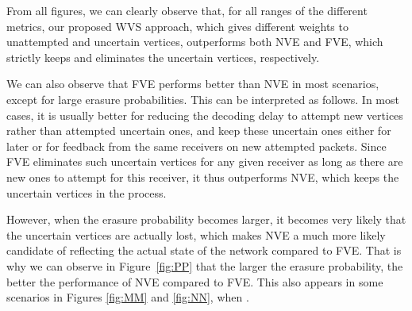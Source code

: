 \documentclass[10pt,jounral]{IEEEtran}
\newcommand{\fref}[1]{Figure~\ref{#1}}
\newcommand{\ignore}[1]{}
\begin{document}
From all figures, we can clearly observe that, for all ranges of the different metrics, our proposed WVS approach, which gives different weights to unattempted and uncertain vertices, outperforms both NVE and FVE, which strictly keeps and eliminates the uncertain vertices, respectively.

We can also observe that FVE performs better than NVE in most scenarios, except for large erasure probabilities. This can be interpreted as follows. In most cases, it is usually better for reducing the decoding delay to attempt new vertices rather than attempted uncertain ones, and keep these uncertain ones either for later or for feedback from the same receivers on new attempted packets. Since FVE eliminates such uncertain vertices for any given receiver as long as there are new ones to attempt for this receiver, it thus outperforms NVE, which keeps the uncertain vertices in the process.

However, when the erasure probability becomes larger, it becomes very likely that the uncertain vertices are actually lost, which makes NVE a much more likely candidate of reflecting the actual state of the network compared to FVE.\ignore{ follows a similar ML trend as the one proposed for the completion delay problem\footnote{The ML here is in the forward link sense only (without considering what happened to the feedback), because the decoding delay is affected by individual packet losses from each individual receiver and not the global state of the network. Consequently, ML do not follow the bounds derived in Corollaries \ref{th:ML-simple} and \ref{th:ML-simple-reciprocal} but rather the simple ML rule that the packet is received (lost) on the forward link if the erasure probability is smaller (larger) than 0.5}, whereas FVE falls away from this ML trend.} That is why we can observe in \fref{fig:PP} that the larger the erasure probability, the better the performance of NVE compared to FVE. This also appears in some scenarios in Figures \ref{fig:MM} and \ref{fig:NN}, when .
\end{document}
